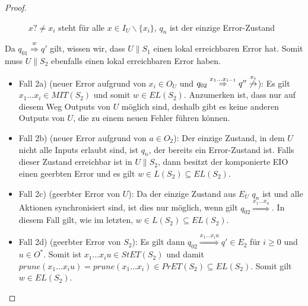 \begin{proof}
\begin{itemize}
\begin{figure} [h!tbp]
\begin{center}
        \caption{$x?\neq x_i$ steht für alle $x\in I_U\backslash\{x_i\}$, $q_n$
          ist der einzige Error-Zustand}
        \label{UmitE}
      \end{center}
      \end{figure}
      Da $q_{01} \overset{w}{\Rightarrow} q'$ gilt, wissen wir, dass $U\|S_1$
      einen lokal erreichbaren Error hat. Somit muss $U\|S_2$ ebenfalls einen
      lokal erreichbaren Error haben.
      \begin{itemize}
        \item Fall 2a) (neuer Error aufgrund von $x_i\in O_U$ und $q_{02}
          \overset{x_1\dots x_{i-1}}{\Rightarrow} q''
          \overset{x_i}{\not{\hspace{-0.1cm}\rightarrow}}$): Es gilt $x_1\dots
          x_i\in MIT(S_2)$ und somit $w\in EL(S_2)$. Anzumerken ist, dass nur
          auf diesem Weg Outputs von $U$ möglich sind, deshalb gibt es keine
          anderen Outputs von $U$, die zu einem neuen Fehler führen können.
        \item Fall 2b) (neuer Error aufgrund von $a\in O_2$): Der einzige
          Zustand, in dem $U$ nicht alle Inputs erlaubt sind, ist $q_n$, der
          bereits ein Error-Zustand ist. Falls dieser Zustand erreichbar ist in
          $U\|S_2$, dann besitzt der komponierte EIO einen geerbten Error und
          es gilt $w\in L(S_2)\subseteq EL(S_2)$.
        \item Fall 2c) (geerbter Error von $U$): Da der einzige Zustand aus
          $E_U$ $q_n$ ist und alle Aktionen synchronisiert sind, ist dies nur
          möglich, wenn gilt $q_{02} \overset{x_1\dots x_n}{\Rightarrow}$. In
          diesem Fall gilt, wie im letzten, $w\in L(S_2)\subseteq EL(S_2)$.
        \item Fall 2d) (geerbter Error von $S_2$): Es gilt dann $q_{02}
          \overset{x_1\dots x_iu}{\Rightarrow} q'\in E_2$ für $i\geq 0$ und
          $u\in O^*$. Somit ist $x_1\dots x_iu\in StET(S_2)$ und damit
          $prune(x_1\dots x_iu)=prune(x_1\dots x_i)\in PrET(S_2)\subseteq
          EL(S_2)$. Somit gilt $w\in EL(S_2)$.
      \end{itemize}
  \end{itemize}
\end{proof}

